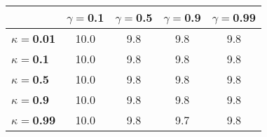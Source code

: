 \begin{tabular}{|l|c|c|c|c|}
\hline
&\textbf{$\gamma =$0.1}&\textbf{$\gamma =$0.5}&\textbf{$\gamma =$0.9}&\textbf{$\gamma =$0.99}\\\hline
\textbf{$\kappa =$0.01}&10.0&9.8&9.8&9.8\\\hline
\textbf{$\kappa =$0.1}&10.0&9.8&9.8&9.8\\\hline
\textbf{$\kappa =$0.5}&10.0&9.8&9.8&9.8\\\hline
\textbf{$\kappa =$0.9}&10.0&9.8&9.8&9.8\\\hline
\textbf{$\kappa =$0.99}&10.0&9.8&9.7&9.8\\\hline
\end{tabular}
